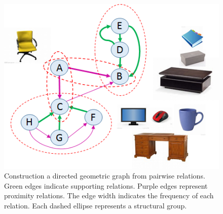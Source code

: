 \begin{figure}
	\centering
	\includegraphics[width=0.98\columnwidth]{figures/geometric_graph.png}
	\caption{Construction a directed geometric graph from pairwise relations. Green edges indicate supporting relations. Purple edges represent proximity relations. The edge width indicates the frequency of each relation. Each dashed ellipse represents a structural group. }
	\label{fig:geometric_graph}
\end{figure}


